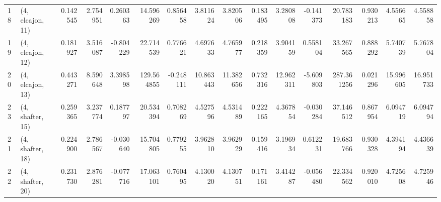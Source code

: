\begin{tabular}{llrrrrrrrrrrrrrr}
18 &  (4, elcajon, 11) &   0.142545 &  2.754951 &  0.260363 &   14.596269 &  0.856458 &   3.811624 &   3.820506 &  0.183495 &   3.280808 & -0.141373 &   20.783183 &  0.930213 &   4.556665 &   4.558858 \\
19 &  (4, elcajon, 12) &   0.181927 &  3.516087 & -0.804229 &   22.714539 &  0.776621 &   4.697633 &   4.765977 &  0.218359 &   3.904159 &  0.558104 &   33.267565 &  0.888292 &   5.740739 &   5.767804 \\
20 &  (4, elcajon, 13) &   0.443271 &  8.590648 &  3.398598 &  129.564855 & -0.248111 &  10.863443 &  11.382656 &  0.732316 &  12.962311 & -5.609803 &  287.361256 &  0.021296 &  15.996605 &  16.951733 \\
23 &  (4, shafter, 15) &   0.259365 &  3.237774 &  0.187797 &   20.534394 &  0.708269 &   4.527596 &   4.531489 &  0.222165 &   4.367854 & -0.030284 &   37.146512 &  0.867954 &   6.094719 &   6.094794 \\
21 &  (4, shafter, 18) &   0.224900 &  2.786567 & -0.030640 &   15.704805 &  0.779255 &   3.962810 &   3.962929 &  0.159416 &   3.196934 &  0.612231 &   19.683766 &  0.930328 &   4.394194 &   4.436639 \\
22 &  (4, shafter, 20) &   0.231730 &  2.876281 & -0.077716 &   17.063101 &  0.760495 &   4.130020 &   4.130751 &  0.171161 &   3.414287 & -0.056480 &   22.334562 &  0.920010 &   4.725608 &   4.725946 \\
\bottomrule
\end{tabular}
